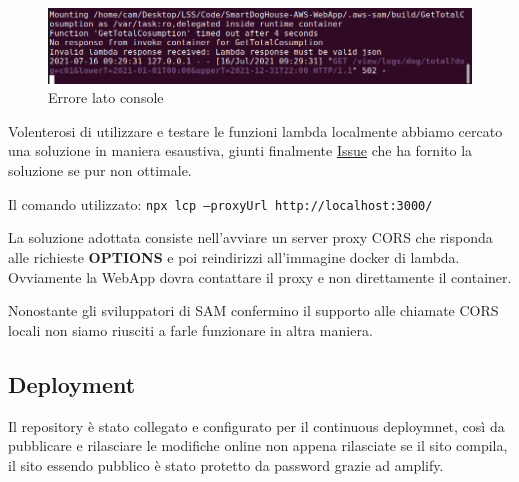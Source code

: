         \begin{figure}[H]
            \caption{Errore lato console}
            \label{fig:ErrorCorsConsole}
            \centering
            \includegraphics[width=1\textwidth]{Images/CorsErrorConsole.PNG}
        \end{figure}
    
        Volenterosi di utilizzare e testare le funzioni lambda localmente abbiamo cercato una soluzione in maniera esaustiva,
        giunti finalmente \href{https://github.com/aws/aws-sam-cli/issues/323#issuecomment-483650280}{Issue} che ha fornito la soluzione se pur non ottimale.
        
        Il comando utilizzato: \texttt{npx lcp --proxyUrl http://localhost:3000/}
        
        La soluzione adottata consiste nell'avviare un server proxy CORS che risponda alle richieste \textbf{OPTIONS} e poi reindirizzi all'immagine docker di lambda. 
        Ovviamente la WebApp dovra contattare il proxy e non direttamente il container.
        
        Nonostante gli sviluppatori di SAM confermino il supporto alle chiamate CORS locali non siamo riusciti a farle funzionare in altra maniera.
        
\subsection{Deployment} 
        Il repository è stato collegato e configurato per il continuous deploymnet, così da pubblicare e rilasciare le modifiche online non appena rilasciate se il sito compila, il sito essendo pubblico è stato protetto da password grazie ad amplify.
        
        
